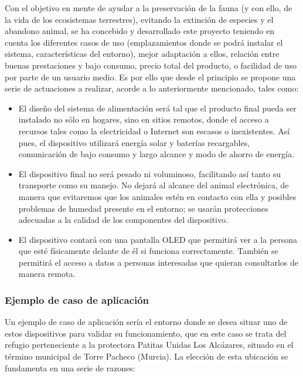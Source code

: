 \documentclass[12pt]{article}
\begin{document}
	\noindent Con el objetivo en mente de ayudar a la preservación de la fauna (y con ello, de la vida de los ecosistemas terrestres), evitando la extinción de especies y el abandono animal, se ha concebido y desarrollado este proyecto teniendo en cuenta los diferentes casos de uso (emplazamientos donde se podrá instalar el sistema, características del entorno), mejor adaptación a ellos, relación entre buenas prestaciones y bajo consumo, precio total del producto, o facilidad de uso por parte de un usuario medio. Es por ello que desde el principio se propone una serie de actuaciones a realizar, acorde a lo anteriormente mencionado, tales como:
	
	\begin{itemize}
		\item El diseño del sistema de alimentación será tal que el producto final pueda ser instalado no sólo en hogares, sino en sitios remotos, donde el acceso a recursos tales como la electricidad o Internet son escasos o inexistentes. Así pues, el dispositivo utilizará energía solar y baterías recargables, comunicación de bajo consumo y largo alcance y modo de ahorro de energía. 
		\item El dispositivo final no será pesado ni voluminoso, facilitando así tanto su transporte como su manejo. No dejará al alcance del animal electrónica, de manera que evitaremos que los animales estén en contacto con ella y posibles problemas de humedad presente en el entorno; se usarán protecciones adecuadas a la calidad de los componentes del dispositivo.
		\item El dispositivo contará con una pantalla OLED que permitirá ver a la persona que esté físicamente delante de él si funciona correctamente. También se permitirá el acceso a datos a personas interesadas que quieran consultarlos de manera remota.

	\end{itemize}

	
	\subsubsection[Ejemplo de caso de aplicación]{Ejemplo de caso de aplicación}
	
	Un ejemplo de caso de aplicación sería el entorno donde se desea situar uno de estos dispositivos para validar su funcionamiento, que en este caso se trata del refugio perteneciente a la protectora Patitas Unidas Los Alcázares, situado en el término municipal de Torre Pacheco (Murcia).
	La elección de esta ubicación se fundamenta en una serie de razones:
	
\end{document}
